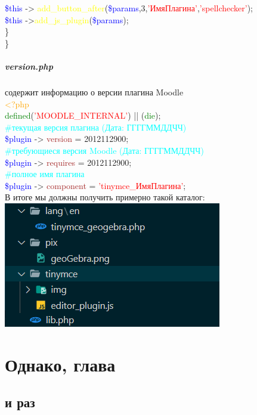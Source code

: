 \documentclass[14pt,Diplom]{diplomwork}
\begin{document}
\textcolor{blue}{\$this} -> \textcolor{yellow}{add\_button\_after}(\textcolor{blue}{\$params},3,\textcolor{red}{'ИмяПлагина'},\textcolor{red}{'spellchecker'});\\

\textcolor{blue}{\$this} ->\textcolor{yellow}{add\_js\_plugin}(\textcolor{blue}{\$params});\\

 \}\\
\}\\


 \paragraph{version.php}
 содержит информацию о версии плагина Moodle\\
  \textcolor{orange}{<?php} \\
 \textcolor{green}{defined}(\textcolor{red}{'MOODLE\_INTERNAL'}) || (\textcolor{green}{die});\\
 \textcolor{cyan}{\#текущая версия плагина (Дата: ГГГГММДДЧЧ)}\\
 \textcolor{blue}{\$plugin} -> \textcolor{brown}{version} = 2012112900; \\
 \textcolor{cyan}{\#требующиеся версия Moodle (Дата: ГГГГММДДЧЧ)}\\
 \textcolor{blue}{\$plugin} -> \textcolor{brown}{requires} = 2012112900; \\
 \textcolor{cyan}{\#полное имя плагина}\\
 \textcolor{blue}{\$plugin} -> \textcolor{brown}{component} = \textcolor{red}{'tinymce\_ИмяПлагина'}; \\
 
В итоге мы должны получить примерно такой каталог:\\

\includegraphics[width=0.5\linewidth]{1.png}



 
\chapter{Однако, глава}
\section{и раз}
\end{document}
